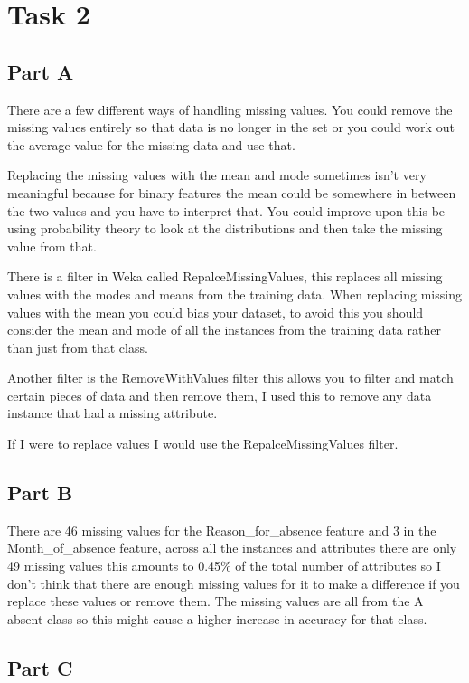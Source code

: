 \documentclass[10pt]{article}
\begin{document}
\section*{Task 2}

\subsection*{Part A}
There are a few different ways of handling missing values. You could remove the missing values entirely so that data is no longer in the set or you could work out the average value for the missing data and use that. 

Replacing the missing values with the mean and mode sometimes isn't very meaningful because for binary features the mean could be somewhere in between the two values and you have to interpret that. You could improve upon this be using probability theory to look at the distributions and then take the missing value from that.

There is a filter in Weka called RepalceMissingValues, this replaces all missing values with the modes and means from the training data. When replacing missing values with the mean you could bias your dataset, to avoid this you should consider the mean and mode of all the instances from the training data rather than just from that class.

Another filter is the RemoveWithValues filter this allows you to filter and match certain pieces of data and then remove them, I used this to remove any data instance that had a missing attribute. 

If I were to replace values I would use the RepalceMissingValues filter.

\subsection*{Part B}
There are 46 missing values for the Reason\_for\_absence feature and 3 in the Month\_of\_absence feature, across all the instances and attributes there are only 49 missing values this amounts to 0.45\% of the total number of attributes so I don't think that there are enough missing values for it to make a difference if you replace these values or remove them. The missing values are all from the A absent class so this might cause a higher increase in accuracy for that class.

\subsection*{Part C}
\end{document}
